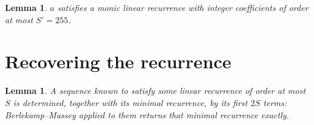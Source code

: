 \documentclass[11pt,a4paper]{article}
\theoremstyle{plain}
\newtheorem{lemma}[theorem]{Lemma}
\theoremstyle{definition}
\begin{document}
\begin{lemma}\label{lem:cf}
$a$ satisfies a monic linear recurrence with integer coefficients of order at most
$S'=255$.
\end{lemma}

\section{Recovering the recurrence}

\begin{lemma}\label{lem:bm}
A sequence known to satisfy some linear recurrence of order at most $S$ is determined, together
with its minimal recurrence, by its first $2S$ terms: Berlekamp--Massey applied to them returns
that minimal recurrence exactly.
\end{lemma}
\end{document}
